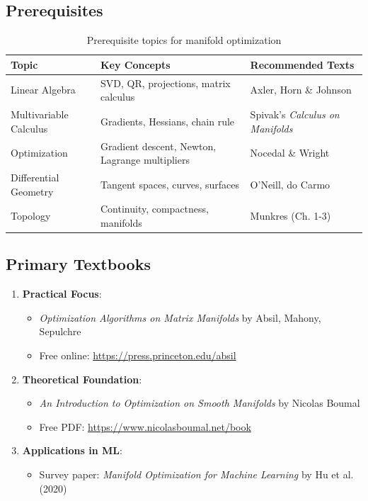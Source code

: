 \documentclass[11pt]{article}
\begin{document}
\subsection{Prerequisites}
\begin{table}[h]
    \centering
    \begin{tabular}{p{} p{} p{}}
        \toprule
        \textbf{Topic} & \textbf{Key Concepts} & \textbf{Recommended Texts} \\
        \midrule
        Linear Algebra & SVD, QR, projections, matrix calculus & Axler, Horn \& Johnson \\
        \addlinespace
        Multivariable Calculus & Gradients, Hessians, chain rule & Spivak's \emph{Calculus on Manifolds} \\
        \addlinespace
        Optimization & Gradient descent, Newton, Lagrange multipliers & Nocedal \& Wright \\
        \addlinespace
        Differential Geometry & Tangent spaces, curves, surfaces & O'Neill, do Carmo \\
        \addlinespace
        Topology & Continuity, compactness, manifolds & Munkres (Ch. 1-3) \\
        \bottomrule
    \end{tabular}
    \caption{Prerequisite topics for manifold optimization}
\end{table}

\subsection{Primary Textbooks}
\begin{enumerate}
    \item \textbf{Practical Focus}: 
    \begin{itemize}
        \item \emph{Optimization Algorithms on Matrix Manifolds} by Absil, Mahony, Sepulchre
        \item Free online: \url{https://press.princeton.edu/absil}
    \end{itemize}
    
    \item \textbf{Theoretical Foundation}:
    \begin{itemize}
        \item \emph{An Introduction to Optimization on Smooth Manifolds} by Nicolas Boumal
        \item Free PDF: \url{https://www.nicolasboumal.net/book}
    \end{itemize}
    
    \item \textbf{Applications in ML}:
    \begin{itemize}
        \item Survey paper: \emph{Manifold Optimization for Machine Learning} by Hu et al. (2020)
    \end{itemize}
\end{enumerate}
\end{document}
